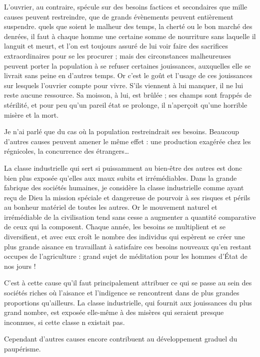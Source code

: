 \documentclass[french,twoside]{book} %
\begin{document}
L'ouvrier, au contraire, spécule sur des besoins factices et secondaires que mille causes peuvent restreindre, que de grands évènements peuvent entièrement suspendre. quels que soient le malheur des temps, la cherté ou le bon marché des denrées, il faut à chaque homme une certaine somme de nourriture sans laquelle il languit et meurt, et l’on est toujours assuré de lui voir faire des sacrifices extraordinaires pour se les procurer ; mais des circonstances malheureuses peuvent porter la population à se refuser certaines jouissances, auxquelles elle se livrait sans peine en d’autres temps. Or c’est le goût et l’usage de ces jouissances sur lesquels l’ouvrier compte pour vivre. S'ils viennent à lui manquer, il ne lui reste aucune ressource. Sa moisson, à lui, est brûlée ; ses champs sont frappés de stérilité, et pour peu qu’un pareil état se prolonge, il n’aperçoit qu’une horrible misère et la mort.\par
Je n’ai parlé que du cas où la population restreindrait ses besoins. Beaucoup d’autres causes peuvent amener le même effet : une production exagérée chez les régnicoles, la concurrence des étrangers…\par
La classe industrielle qui sert si puissamment au bien-être des autres est donc bien plus exposée qu’elles aux maux subits et irrémédiables. Dans la grande fabrique des sociétés humaines, je considère la classe industrielle comme ayant reçu de Dieu la mission spéciale et dangereuse de pourvoir à ses risques et périls au bonheur matériel de toutes les autres. Or le mouvement naturel et irrémédiable de la civilisation tend sans cesse a augmenter a quantité comparative de ceux qui la composent. Chaque année, les besoins se multiplient et se diversifient, et avec eux croît le nombre des individus qui espèrent se créer une plus grande aisance en travaillant à satisfaire ces besoins nouveaux qu’en restant occupes de l’agriculture : grand sujet de méditation pour les hommes d’État de nos jours !\par
C'est à cette cause qu’il faut principalement attribuer ce qui se passe au sein des sociétés riches où l’aisance et l’indigence se rencontrent dans de plus grandes proportions qu’ailleurs. La classe industrielle, qui fournit aux jouissances du plus grand nombre, est exposée elle-même à des misères qui seraient presque inconnues, si cette classe n existait pas.\par
Cependant d’autres causes encore contribuent au développement graduel du paupérisme.\par
\end{document}
